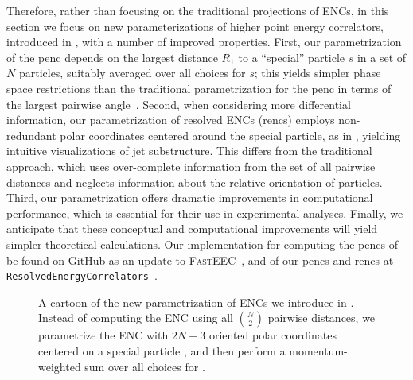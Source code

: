 Therefore, rather than focusing on the traditional projections of ENCs, in this section we focus on new parameterizations of higher point energy correlators, introduced in \Reff{}, with a number of improved properties.
%
First, our parametrization of the \gls{penc} depends on the largest distance \(R_1\) to a ``special'' particle $s$ in a set of $N$ particles, suitably averaged over all choices for $s$;
%
this yields simpler phase space restrictions than the traditional parametrization for the \gls{penc} in terms of the largest pairwise angle~\cite{Chen:2020vvp}.
%
Second, when considering more differential information, our parametrization of resolved ENCs (\gls{renc}s) employs non-redundant polar coordinates centered around the special particle, as in , yielding intuitive visualizations of jet substructure.
%
This differs from the traditional approach, which uses over-complete information from the set of all pairwise distances and neglects information about the relative orientation of particles.
%
Third, our parametrization offers dramatic improvements in computational performance, which is essential for their use in experimental analyses.
%
Finally, we anticipate that these conceptual and computational improvements will yield simpler theoretical calculations.
%
Our implementation for computing the \glspl{penc} of  be found on GitHub as an update to \textsc{FastEEC}~\cite{FASTEEC}, and of our \glspl{penc} and \gls{renc}s at \texttt{ResolvedEnergyCorrelators}~\cite{github:RENC}.


\begin{figure}
    \centering
    \scalebox{1.2}{
        
    }
    \caption[Cartoon of the new parameterization of ENCs introduced by the author and collaborators]{
        A cartoon of the new parametrization of ENCs we introduce in .
        Instead of computing the ENC using all \(\binom{N}{2}\) pairwise distances, we parametrize the ENC with \(2N - 3\) oriented polar coordinates centered on a special particle \izero{}, and then perform a momentum-weighted sum over all choices for \izero{}.
    }
	\label{fig:cartoon}
\end{figure}


